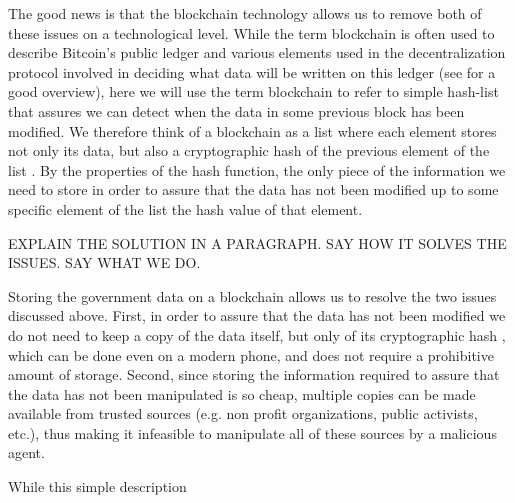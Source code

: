 The good news is that the blockchain technology allows us to remove both of these issues on a technological level. While the term blockchain is often used to describe Bitcoin's public ledger and various elements used in the decentralization protocol involved in deciding what data will be written on this ledger (see \cite{NarayananC17} for a good overview), here we will use the term blockchain to refer to simple hash-list that assures we can detect when the data in some previous block has been modified. We  therefore think of a blockchain as a list where each element stores not only its data, but also a cryptographic hash of the previous element of the list \cite{bitcoinbook}. By the properties of the hash function, the only piece of the information we need to store in order to assure that the data has not been modified up to some specific element of the list the hash value of that element. 



EXPLAIN THE SOLUTION IN A PARAGRAPH. SAY HOW IT SOLVES THE ISSUES. SAY WHAT WE DO.


Storing the government data on a blockchain allows us to resolve the two issues discussed above. First, in order to assure that the data has not been modified we do not need to keep a copy of the data itself, but only of its cryptographic hash \cite{bitcoinbook}, which can be done even on a modern phone, and does not require a prohibitive amount of storage. Second, since storing the information required to assure that the data has not been manipulated is so cheap, multiple copies can be made available from trusted sources (e.g. non profit organizations, public activists, etc.), thus making it infeasible to manipulate all of these sources by a malicious agent.


While this simple description 

